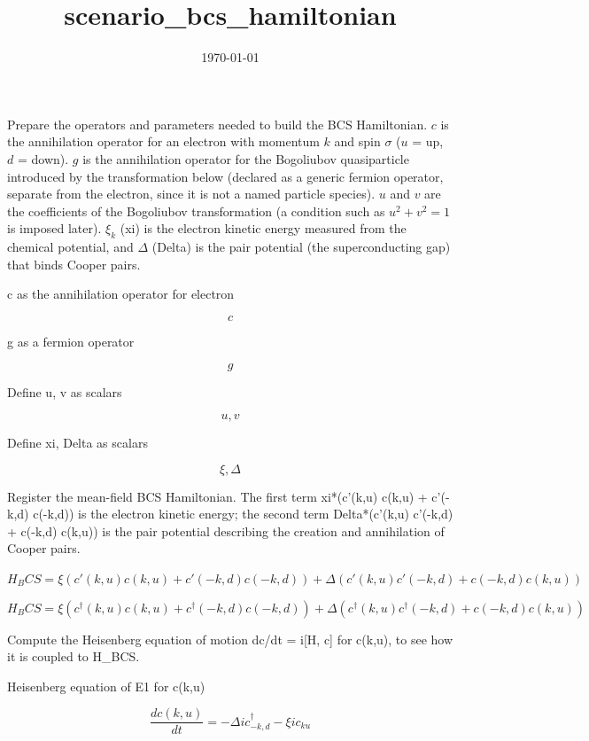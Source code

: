 \documentclass[dvipdfmx]{article}
\title{scenario\_bcs\_hamiltonian}
\date{\today}
\begin{document}
\maketitle

Prepare the operators and parameters needed to build the BCS Hamiltonian. $c$ is the annihilation operator for an electron with momentum $k$ and spin $\sigma$ ($u$ = up, $d$ = down). $g$ is the annihilation operator for the Bogoliubov quasiparticle introduced by the transformation below (declared as a generic fermion operator, separate from the electron, since it is not a named particle species). $u$ and $v$ are the coefficients of the Bogoliubov transformation (a condition such as $u^2+v^2=1$ is imposed later). $\xi_k$ (xi) is the electron kinetic energy measured from the chemical potential, and $\Delta$ (Delta) is the pair potential (the superconducting gap) that binds Cooper pairs.

c as the annihilation operator for electron

\[
  c
\]

g as a fermion operator

\[
  g
\]

Define u, v as scalars

\[
  u, v
\]

Define xi, Delta as scalars

\[
  \xi, \Delta
\]

Register the mean-field BCS Hamiltonian. The first term xi*(c'(k,u) c(k,u) + c'(-k,d) c(-k,d)) is the electron kinetic energy; the second term Delta*(c'(k,u) c'(-k,d) + c(-k,d) c(k,u)) is the pair potential describing the creation and annihilation of Cooper pairs.

$H_BCS = \xi (c'(k,u) c(k,u) + c'(-k,d) c(-k,d)) + \Delta (c'(k,u) c'(-k,d) + c(-k,d) c(k,u))$

\begin{equation}
  H_BCS = \xi (c^{\dagger}(k,u) c(k,u) + c^{\dagger}(-k,d) c(-k,d)) + \Delta (c^{\dagger}(k,u) c^{\dagger}(-k,d) + c(-k,d) c(k,u))
  \label{eq:E1}
\end{equation}

Compute the Heisenberg equation of motion dc/dt = i[H, c] for c(k,u), to see how it is coupled to H\_BCS.

Heisenberg equation of E1 for c(k,u)

\begin{equation}
  \frac{d c(k,u)}{d t} = - \Delta \mathit{i} {c}_{-k,d}^{\dagger} - \xi \mathit{i} {c}_{ku}
  \label{eq:E2}
\end{equation}
\end{document}
